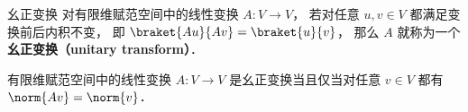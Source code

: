 
\begin{issues}
\issueDraft
\end{issues}


\begin{definition}{幺正变换}
对有限维赋范空间中的线性变换 $A: V\to V$， 若对任意 $u, v \in V$ 都满足变换前后内积不变， 即 $\braket{Au}{Av} = \braket{u}{v}$， 那么 $A$ 就称为一个\textbf{幺正变换（unitary transform）}．
\end{definition}

\begin{theorem}{}
有限维赋范空间中的线性变换 $A: V\to V$ 是幺正变换当且仅当对任意 $v\in V$ 都有 $\norm{Av} = \norm{v}$．
\end{theorem}
